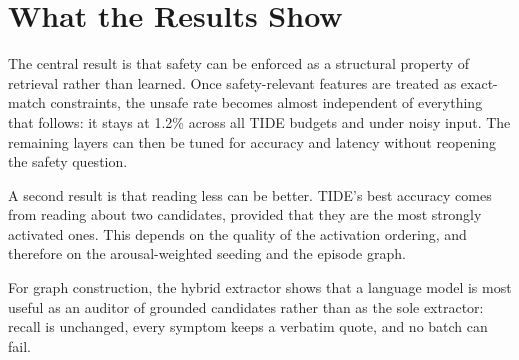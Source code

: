 \documentclass[12pt,a4paper,oneside]{report}
\begin{document}
\section{What the Results Show}
The central result is that safety can be enforced as a structural property of retrieval rather than learned. Once safety-relevant features are treated as exact-match constraints, the unsafe rate becomes almost independent of everything that follows: it stays at 1.2\% across all TIDE budgets and under noisy input. The remaining layers can then be tuned for accuracy and latency without reopening the safety question.

A second result is that reading less can be better. TIDE's best accuracy comes from reading about two candidates, provided that they are the most strongly activated ones. This depends on the quality of the activation ordering, and therefore on the arousal-weighted seeding and the episode graph.

For graph construction, the hybrid extractor shows that a language model is most useful as an auditor of grounded candidates rather than as the sole extractor: recall is unchanged, every symptom keeps a verbatim quote, and no batch can fail.
\end{document}
